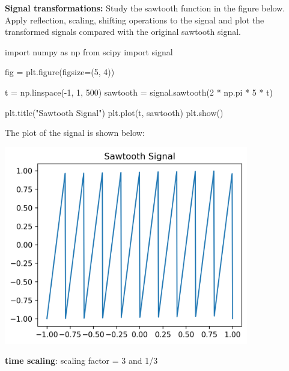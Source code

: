\documentclass[a4paper, 10pt]{article}
\begin{document}
\newpage

\begin{problem}
\textbf{Signal transformations:} Study the sawtooth function in the figure below.
Apply reflection, scaling, shifting operations to the signal and plot the transformed signals compared with the original sawtooth signal.

\begin{codingbox}
import numpy as np
from scipy import signal

fig = plt.figure(figsize=(5, 4))

t = np.linspace(-1, 1, 500)
sawtooth = signal.sawtooth(2 * np.pi * 5 * t)

plt.title("Sawtooth Signal")
plt.plot(t, sawtooth)
plt.show()
\end{codingbox}

The plot of the signal is shown below:
\begin{center}
    \includegraphics[width=0.8\textwidth]{images/problem_6_sawtooth.png}
\end{center}
\end{problem}

\newpage

\begin{subproblems}
    \item \textbf{time scaling}: scaling factor = 3 and 1/3
\end{subproblems}
\end{document}
